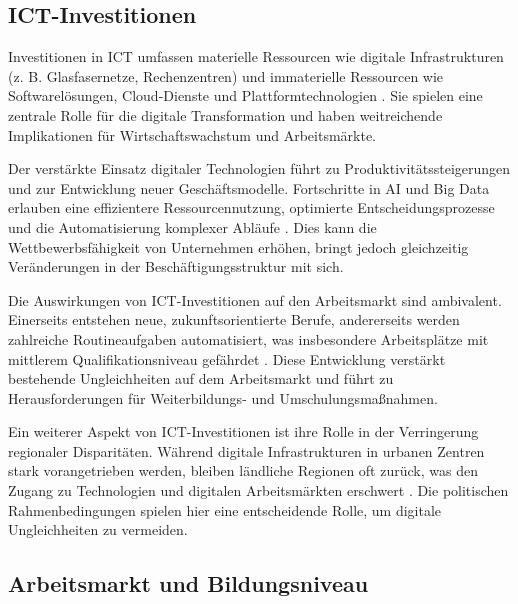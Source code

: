 
\subsection{ICT-Investitionen}

Investitionen in \ac{ICT} umfassen materielle Ressourcen wie digitale Infrastrukturen
(z. B. Glasfasernetze, Rechenzentren) und immaterielle Ressourcen wie Softwarelösungen,
Cloud-Dienste und Plattformtechnologien \parencite[vgl.][S. 15-17]{oecd2019measuring}. 
Sie spielen eine zentrale Rolle für die digitale Transformation und haben weitreichende
Implikationen für Wirtschaftswachstum und Arbeitsmärkte.

Der verstärkte Einsatz digitaler Technologien führt zu Produktivitätssteigerungen und
zur Entwicklung neuer Geschäftsmodelle. Fortschritte in \ac{AI} und Big Data erlauben
eine effizientere Ressourcennutzung, optimierte Entscheidungsprozesse und die
Automatisierung komplexer Abläufe \parencite[vgl.][S. 15-17]{oecd2019measuring}. Dies
kann die Wettbewerbsfähigkeit von Unternehmen erhöhen, bringt jedoch gleichzeitig
Veränderungen in der Beschäftigungsstruktur mit sich.

Die Auswirkungen von \ac{ICT}-Investitionen auf den Arbeitsmarkt sind ambivalent.
Einerseits entstehen neue, zukunftsorientierte Berufe, andererseits werden zahlreiche
Routineaufgaben automatisiert, was insbesondere Arbeitsplätze mit mittlerem
Qualifikationsniveau gefährdet \parencite[vgl.][S. 40]{frey2013thefuture}. Diese
Entwicklung verstärkt bestehende Ungleichheiten auf dem Arbeitsmarkt und führt zu
Herausforderungen für Weiterbildungs- und Umschulungsmaßnahmen.

Ein weiterer Aspekt von \ac{ICT}-Investitionen ist ihre Rolle in der Verringerung
regionaler Disparitäten. Während digitale Infrastrukturen in urbanen Zentren stark
vorangetrieben werden, bleiben ländliche Regionen oft zurück, was den Zugang zu
Technologien und digitalen Arbeitsmärkten erschwert 
\parencite[vgl.][S. 22]{brynjolfsson2014thesecond}. Die politischen Rahmenbedingungen 
spielen hier eine entscheidende Rolle, um digitale Ungleichheiten zu vermeiden.


\subsection{Arbeitsmarkt und Bildungsniveau}

